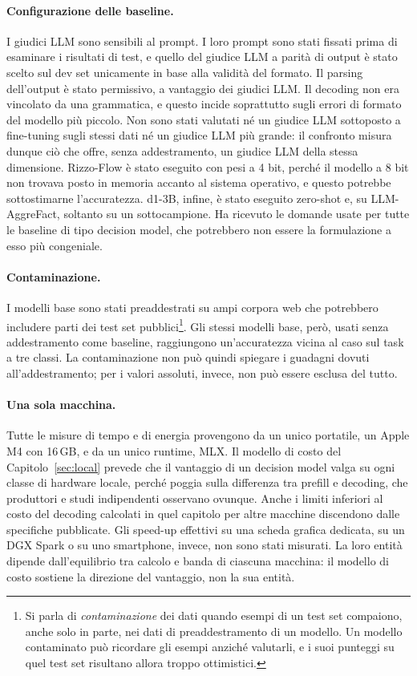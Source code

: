 \paragraph{Configurazione delle baseline.} I giudici LLM sono sensibili al prompt. I loro prompt sono stati
fissati prima di esaminare i risultati di test, e quello del giudice LLM a parità di output è stato scelto sul dev set
unicamente in base alla validità del formato. Il parsing dell'output è stato permissivo, a vantaggio dei giudici LLM. Il
decoding non era vincolato da una grammatica, e questo incide soprattutto sugli errori di formato del modello più
piccolo. Non sono stati valutati né un giudice LLM sottoposto a fine-tuning sugli stessi dati né un giudice LLM più grande: il
confronto misura dunque ciò che offre, senza addestramento, un giudice LLM della stessa dimensione. Rizzo-Flow è stato
eseguito con pesi a 4 bit, perché il modello a 8 bit non trovava posto in memoria accanto al sistema operativo, e questo
potrebbe sottostimarne l'accuratezza. d1-3B, infine, è stato eseguito zero-shot e, su LLM-AggreFact, soltanto su un
sottocampione. Ha ricevuto le domande usate per tutte le baseline di tipo decision model, che potrebbero non essere la formulazione
a esso più congeniale.

\paragraph{Contaminazione.} I modelli base sono stati preaddestrati su ampi corpora web che potrebbero includere parti
dei test set pubblici\footnote{Si parla di \emph{contaminazione} dei dati quando esempi di un test set compaiono, anche
solo in parte, nei dati di preaddestramento di un modello. Un modello contaminato può ricordare gli esempi anziché
valutarli, e i suoi punteggi su quel test set risultano allora troppo ottimistici.}. Gli stessi modelli base, però,
usati senza addestramento come baseline, raggiungono un'accuratezza vicina al caso sul task a tre classi. La
contaminazione non può quindi spiegare i guadagni dovuti all'addestramento; per i valori assoluti, invece, non può essere
esclusa del tutto.

\paragraph{Una sola macchina.} Tutte le misure di tempo e di energia provengono da un unico portatile, un Apple M4 con
16\,GB, e da un unico runtime, MLX. Il modello di costo del Capitolo~\ref{sec:local} prevede che il vantaggio di un
decision model valga su ogni classe di hardware locale, perché poggia sulla differenza tra prefill e decoding, che produttori
e studi indipendenti osservano ovunque. Anche i limiti inferiori al costo del decoding calcolati in quel capitolo per
altre macchine discendono dalle specifiche pubblicate. Gli speed-up effettivi su una scheda grafica dedicata, su un DGX
Spark o su uno smartphone, invece, non sono stati misurati. La loro entità dipende dall'equilibrio tra calcolo e banda di
ciascuna macchina: il modello di costo sostiene la direzione del vantaggio, non la sua entità.
